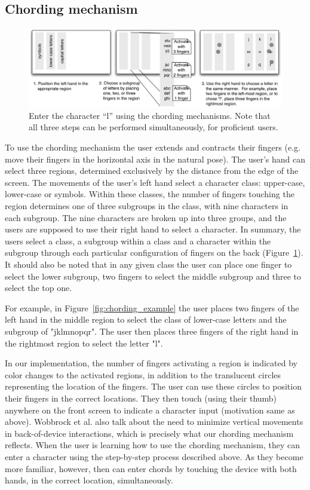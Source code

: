 \subsection{Chording mechanism}
\begin{figure}
    \includegraphics[width=\textwidth]{Figures/chording_explaination.pdf} 
    \caption{Enter the character ``l'' using the chording mechanisms.
      Note that all three steps can be performed simultaneously, for
      proficient users.}
    \label{fig:chording_explanation}
\end{figure} 

To use the chording mechanism the user extends and contracts their fingers (e.g. move their fingers in the horizontal axis in the natural pose). The user's hand can select three regions, determined exclusively by the distance from the edge of the screen. The movements of the user's left hand select a character class: upper-case, lower-case or symbols. Within these classes, the number of fingers touching the region determines one of three subgroups in the class, with nine characters in each subgroup. The nine characters are broken up into three groups, and the users are supposed to use their right hand to select a character. In summary, the users select a class, a subgroup within a class and a character within the subgroup through each particular configuration of fingers on the back (Figure~\ref{fig:chording_explanation}). It should also be noted that in any given class the user can place one finger to select the lower subgroup, two fingers to select the middle subgroup and three to select the top one.

For example, in Figure~\ref{fig:chording_example} the user places two fingers of the left hand in the middle region to select the class of lower-case letters and the subgroup of "jklmnopqr". The user then places three fingers of the right hand in the rightmost region to select the letter "l".

In our implementation, the number of fingers activating a region is indicated by color changes to the activated regions, in addition to the translucent circles representing the location of the fingers. The user can use these circles to position their fingers in the correct locations. They then touch (using their thumb) anywhere on the front screen to indicate a character input (motivation same as above). Wobbrock et al. \cite{Wobbrock} also talk about the need to minimize vertical movements in back-of-device interactions, which is precisely what our chording mechanism reflects. When the user is learning how to use the chording mechanism, they can enter a character using the step-by-step process described above.  As they become more familiar, however, then can enter chords by touching the device with both hands, in the correct location, simultaneously.

